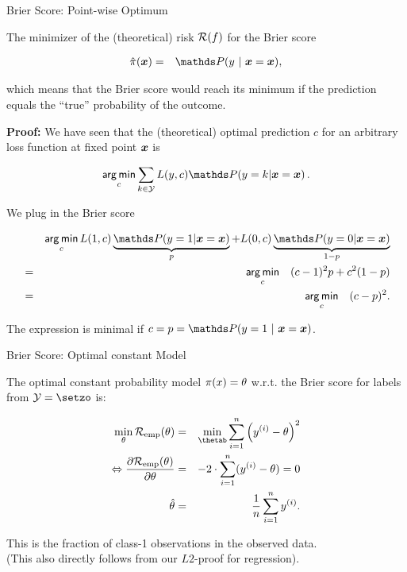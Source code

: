 \begin{vbframe}{Brier Score: Point-wise Optimum}

The minimizer of the (theoretical) risk $\mathcal{R}(f)$ for the Brier score  

\begin{eqnarray*}
\hat \pi(\xv) &=& \P(y~|~\xv = \xv),
\end{eqnarray*}

which means that the Brier score would reach its minimum if the prediction equals the \enquote{true} probability of the outcome. 

\lz 

\textbf{Proof: }We have seen that the (theoretical) optimal prediction $c$ for an arbitrary loss function at fixed point $\bm{x}$ is

$$
\argmin_{c} \sum_{k \in \Yspace} L(y, c) \P(y = k| \xv = \xv)\,.
$$

We plug in the Brier score

\vspace*{-0.3cm}

\begin{footnotesize}
  \begin{eqnarray*}
    && \argmin_c L(1, c) \underbrace{\P(y = 1| \xv = \xv)}_p + L(0, c) \underbrace{\P(y = 0| \xv = \xv)}_{1 - p} \\ 
    &=&  \argmin_c \quad (c - 1)^2 p + c^2 (1 - p)\\
    &=&  \argmin_c \quad (c - p)^2.
  \end{eqnarray*}
\end{footnotesize}

The expression is minimal if $c = p = \P(y = 1~|~\xv = \xv)$.

\end{vbframe}

\begin{vbframe}{Brier Score: Optimal constant Model}

The optimal constant probability model $\pi(x) = \theta$ w.r.t. the Brier score for labels from $\Yspace = \setzo$ is:

\begin{eqnarray*}
  \min_{\theta} \riske(\theta) &=& \min_{\thetab} \sumin \left(\yi - \theta\right)^2 \\
  \Leftrightarrow \frac{\partial \riske(\theta)}{\partial \theta} &=& - 2 \cdot \sumin (\yi - \theta) = 0 \\
  \hat \theta &=& \frac{1}{n} \sumin \yi.   
\end{eqnarray*}

This is the fraction of class-1 observations in the observed data.\\
(This also directly follows from our $L2$-proof for regression).

\end{vbframe}



